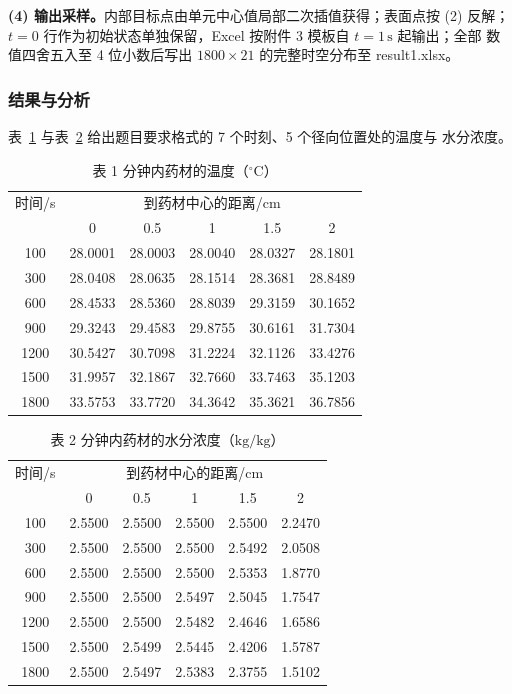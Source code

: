 \documentclass{ctexart}
\begin{document}
\textbf{(4) 输出采样。}内部目标点由单元中心值局部二次插值获得；表面点按 (2) 反解；
$t=0$ 行作为初始状态单独保留，Excel 按附件 3 模板自 $t=1\,\mathrm{s}$ 起输出；全部
数值四舍五入至 4 位小数后写出 $1800\times21$ 的完整时空分布至 result1.xlsx。

\subsubsection{结果与分析}

表~\ref{tab:T1} 与表~\ref{tab:C1} 给出题目要求格式的 7 个时刻、5 个径向位置处的温度与
水分浓度。

\begin{table}[htbp]
  \centering
  \caption{表 1 分钟内药材的温度（$^{\circ}\mathrm{C}$）}
  \label{tab:T1}
  \begin{tabular}{cccccc}
    \hline
    时间/s & \multicolumn{5}{c}{到药材中心的距离/cm} \\
    & 0 & 0.5 & 1 & 1.5 & 2 \\
    \hline
    100   & 28.0001 & 28.0003 & 28.0040 & 28.0327 & 28.1801 \\
    300   & 28.0408 & 28.0635 & 28.1514 & 28.3681 & 28.8489 \\
    600   & 28.4533 & 28.5360 & 28.8039 & 29.3159 & 30.1652 \\
    900   & 29.3243 & 29.4583 & 29.8755 & 30.6161 & 31.7304 \\
    1200  & 30.5427 & 30.7098 & 31.2224 & 32.1126 & 33.4276 \\
    1500  & 31.9957 & 32.1867 & 32.7660 & 33.7463 & 35.1203 \\
    1800  & 33.5753 & 33.7720 & 34.3642 & 35.3621 & 36.7856 \\
    \hline
  \end{tabular}
\end{table}

\begin{table}[htbp]
  \centering
  \caption{表 2 分钟内药材的水分浓度（$\mathrm{kg/kg}$）}
  \label{tab:C1}
  \begin{tabular}{cccccc}
    \hline
    时间/s & \multicolumn{5}{c}{到药材中心的距离/cm} \\
    & 0 & 0.5 & 1 & 1.5 & 2 \\
    \hline
    100   & 2.5500 & 2.5500 & 2.5500 & 2.5500 & 2.2470 \\
    300   & 2.5500 & 2.5500 & 2.5500 & 2.5492 & 2.0508 \\
    600   & 2.5500 & 2.5500 & 2.5500 & 2.5353 & 1.8770 \\
    900   & 2.5500 & 2.5500 & 2.5497 & 2.5045 & 1.7547 \\
    1200  & 2.5500 & 2.5500 & 2.5482 & 2.4646 & 1.6586 \\
    1500  & 2.5500 & 2.5499 & 2.5445 & 2.4206 & 1.5787 \\
    1800  & 2.5500 & 2.5497 & 2.5383 & 2.3755 & 1.5102 \\
    \hline
  \end{tabular}
\end{table}
\end{document}
